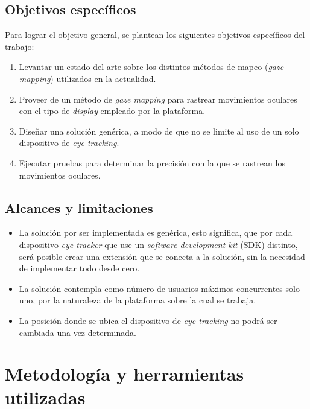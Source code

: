 \subsection{Objetivos espec\'ificos}
Para lograr el objetivo general, se plantean los siguientes objetivos específicos del trabajo:
\begin{enumerate}
    \item Levantar un estado del arte sobre los distintos métodos de mapeo (\textit{gaze mapping}) utilizados en la actualidad.
    \item Proveer de un método de \textit{gaze mapping} para rastrear movimientos oculares con el tipo de \textit{display} empleado por la plataforma.
    \item Diseñar una solución genérica, a modo de que no se limite al uso de un solo dispositivo de \textit{eye tracking}.
    \item Ejecutar pruebas para determinar la precisión con la que se rastrean los movimientos oculares.
\end{enumerate}

\subsection{Alcances y limitaciones}
\begin{itemize}
    \item La solución por ser implementada es genérica, esto significa, que por cada dispositivo \textit{eye tracker} que use un \textit{software development kit} (SDK) distinto, será posible crear una extensión que se conecta a la solución, sin la necesidad de implementar todo desde cero.
    \item La solución contempla como número de usuarios máximos concurrentes solo uno, por la naturaleza de la plataforma sobre la cual se trabaja.
    \item La posición donde se ubica el dispositivo de \textit{eye tracking} no podrá ser cambiada una vez determinada.
\end{itemize}

\section{Metodolog\'ia y herramientas utilizadas}
\label{intro:metodologia}

